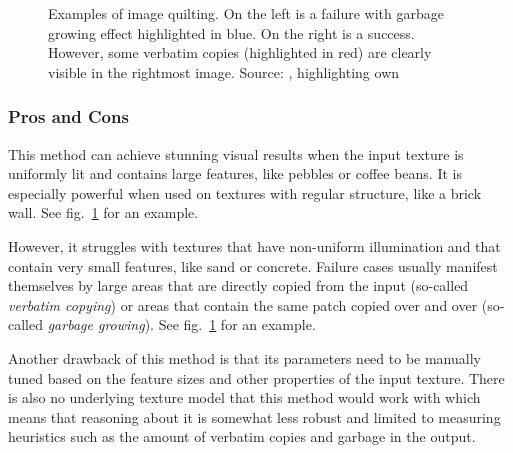 \begin{figure}
    \centering
    \caption{Examples of image quilting. On the left is a failure with garbage growing effect highlighted in blue. On the right is a success. However, some verbatim copies (highlighted in red) are clearly visible in the rightmost image. Source: \citet{Raad2018}, highlighting own}
    \label{fig:background_quilting_pros_cons}
\end{figure}

\subsubsection{Pros and Cons}
\label{section:background-texture_synthesis-patch_based-pros_and_cons}

This method can achieve stunning visual results when the input texture is uniformly lit and contains large features, like pebbles or coffee beans. It is especially powerful when used on textures with regular structure, like a brick wall. See fig.~\ref{fig:background_quilting_pros_cons} for an example.

However, it struggles with textures that have non-uniform illumination and that contain very small features, like sand or concrete. Failure cases usually manifest themselves by large areas that are directly copied from the input (so-called \textit{verbatim copying}) or areas that contain the same patch copied over and over (so-called \textit{garbage growing}). See fig.~\ref{fig:background_quilting_pros_cons} for an example.

Another drawback of this method is that its parameters need to be manually tuned based on the feature sizes and other properties of the input texture. There is also no underlying texture model that this method would work with which means that reasoning about it is somewhat less robust and limited to measuring heuristics such as the amount of verbatim copies and garbage in the output.

